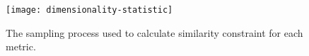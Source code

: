 \begin{figure}
\begin{center}

\begin{minipage}{0.45\linewidth}
\texttt{[image: dimensionality-statistic]}
\end{minipage}
\begin{minipage}{0.45\linewidth}
\caption{
The sampling process used to calculate similarity constraint for each metric.
}
\label{fig:dimensionality_measure}
\end{minipage}
\end{center}
\end{figure}
